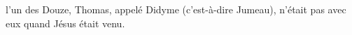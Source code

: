 \encetemps l’un des Douze, Thomas, appelé Didyme (c’est-à-dire Jumeau),
	n’était pas avec eux quand Jésus était venu.
